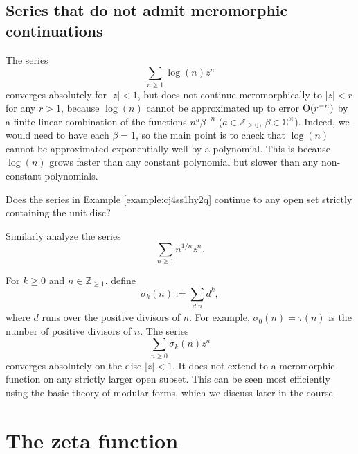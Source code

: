 \documentclass[reqno]{amsart}  \numberwithin{theorem}{section} \numberwithin{equation}{section}
\begin{document}
\subsection{Series that do not admit meromorphic continuations}
\begin{example}\label{example:cj4ss1hy2q}
  The series
  \begin{equation*}
    \sum_{n \geq 1} \log(n) z^n
  \end{equation*}
  converges absolutely for $\lvert z \rvert < 1$, but does not continue meromorphically to $|z| < r$ for any $r > 1$, because $\log(n)$ cannot be approximated up to error $\operatorname{O}(r^{-n})$ by a finite linear combination of the functions $n^a \beta^{-n}$ ($a \in \mathbb{Z}_{\geq 0}$, $\beta \in \mathbb{C}^\times$).  Indeed, we would need to have each $\beta = 1$, so the main point is to check that $\log(n)$ cannot be approximated exponentially well by a polynomial.  This is because $\log(n)$ grows faster than any constant polynomial but slower than any non-constant polynomials.
\end{example}
\begin{question}
  Does the series in Example \ref{example:cj4ss1hy2q} continue to any open set strictly containing the unit disc?
\end{question}
\begin{exercise}
  Similarly analyze the series
  \begin{equation*}
    \sum_{n \geq 1} n^{1 / n} z^n.
  \end{equation*}
\end{exercise}
\begin{example}
  For $k \geq 0$ and $n \in \mathbb{Z}_{\geq 1}$, define
  \begin{equation*}
    \sigma_k(n) := \sum_{d | n} d^k,
  \end{equation*}
  where $d$ runs over the positive divisors of $n$.  For example, $\sigma_0(n) = \tau(n)$ is the number of positive divisors of $n$.  The series
  \begin{equation*}
    \sum_{n \geq 0} \sigma_k (n) z^n
  \end{equation*}
  converges absolutely on the disc $\lvert z \rvert < 1$.  It does not extend to a meromorphic function on any strictly larger open subset.  This can be seen most efficiently using the basic theory of modular forms, which we discuss later in the course.
\end{example}

\newpage
\section{The zeta function}
\end{document}
